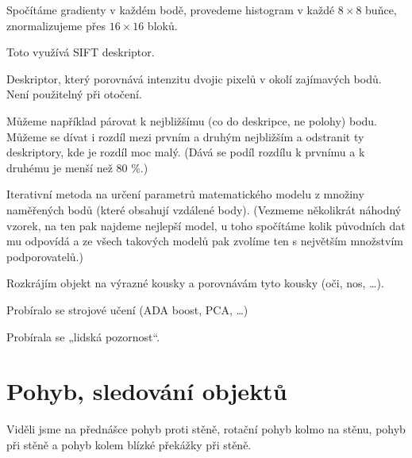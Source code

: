 \documentclass[12pt]{article}					%
\begin{document}
\begin{definice}
	Spočítáme gradienty v každém bodě, provedeme histogram v každé $8\times 8$ buňce, znormalizujeme přes $16\times 16$ bloků.

	Toto využívá SIFT deskriptor.
\end{definice}

\begin{definice}
	Deskriptor, který porovnává intenzitu dvojic pixelů v okolí zajímavých bodů. Není použitelný při otočení.
\end{definice}


\begin{definice}
	Můžeme například párovat k nejbližšímu (co do deskripce, ne polohy) bodu. Můžeme se dívat i rozdíl mezi prvním a druhým nejbližším a odstranit ty deskriptory, kde je rozdíl moc malý. (Dává se podíl rozdílu k prvnímu a k druhému je menší než 80 \%.)
\end{definice}

\begin{definice}[RANSAC = RANdom SAmple Consensus]
	Iterativní metoda na určení parametrů matematického modelu z množiny naměřených bodů (které obsahují vzdálené body). (Vezmeme několikrát náhodný vzorek, na ten pak najdeme nejlepší model, u toho spočítáme kolik původních dat mu odpovídá a ze všech takových modelů pak zvolíme ten s největším množstvím podporovatelů.)
\end{definice}

\begin{definice}
	Rozkrájím objekt na výrazné kousky a porovnávám tyto kousky (oči, nos, …).
\end{definice}


\begin{poznamka}
	Probíralo se strojové učení (ADA boost, PCA, …)
\end{poznamka}


\begin{poznamka}
	Probírala se „lidská pozornost“.
\end{poznamka}


\section{Pohyb, sledování objektů}
\begin{definice}
	Viděli jsme na přednášce pohyb proti stěně, rotační pohyb kolmo na stěnu, pohyb při stěně a pohyb kolem blízké překážky při stěně.
\end{definice}
\end{document}
